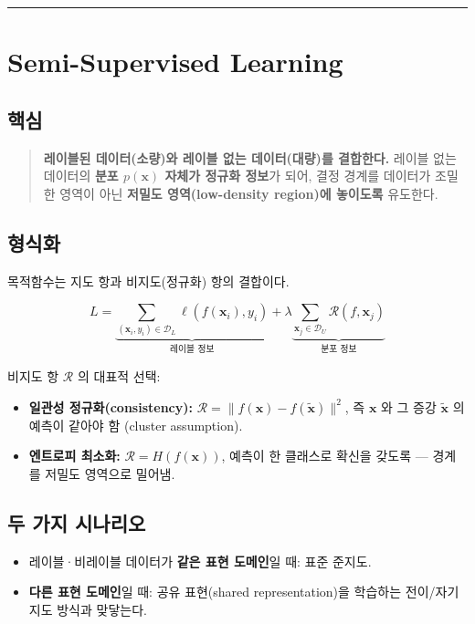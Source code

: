 \documentclass[
  letterpaper,
  DIV=11,
  numbers=noendperiod]{scrreprt}
\providecommand{\tightlist}{%
  \setlength{\itemsep}{0pt}\setlength{\parskip}{0pt}}
\begin{document}
\begin{center}\rule{0.5\linewidth}{0.5pt}\end{center}

\chapter{Semi-Supervised Learning}\label{sec-semi}

\section{핵심}\label{uxd575uxc2ec-2}

\begin{quote}
\textbf{레이블된 데이터(소량)와 레이블 없는 데이터(대량)를 결합한다.}
레이블 없는 데이터의 \textbf{분포 \(p(\bm{x})\) 자체가 정규화 정보}가
되어, 결정 경계를 데이터가 조밀한 영역이 아닌 \textbf{저밀도
영역(low-density region)에 놓이도록} 유도한다.
\end{quote}

\section{형식화}\label{uxd615uxc2dduxd654-1}

목적함수는 지도 항과 비지도(정규화) 항의 결합이다.

\[
L = \underbrace{\sum_{(\bm{x}_i,y_i)\in\mathcal{D}_L}\ell(f(\bm{x}_i),y_i)}_{\text{레이블 정보}}
+ \lambda\underbrace{\sum_{\bm{x}_j\in\mathcal{D}_U}\mathcal{R}(f,\bm{x}_j)}_{\text{분포 정보}}
\]

비지도 항 \(\mathcal{R}\) 의 대표적 선택:

\begin{itemize}
\tightlist
\item
  \textbf{일관성 정규화(consistency):}
  \(\mathcal{R}=\|f(\bm{x})-f(\tilde{\bm{x}})\|^2\), 즉 \(\bm{x}\) 와 그
  증강 \(\tilde{\bm{x}}\) 의 예측이 같아야 함 (cluster assumption).
\item
  \textbf{엔트로피 최소화:} \(\mathcal{R}=H(f(\bm{x}))\), 예측이 한
  클래스로 확신을 갖도록 --- 경계를 저밀도 영역으로 밀어냄.
\end{itemize}

\section{두 가지
시나리오}\label{uxb450-uxac00uxc9c0-uxc2dcuxb098uxb9acuxc624}

\begin{itemize}
\tightlist
\item
  레이블·비레이블 데이터가 \textbf{같은 표현 도메인}일 때: 표준 준지도.
\item
  \textbf{다른 표현 도메인}일 때: 공유 표현(shared representation)을
  학습하는 전이/자기지도 방식과 맞닿는다.
\end{itemize}
\end{document}
